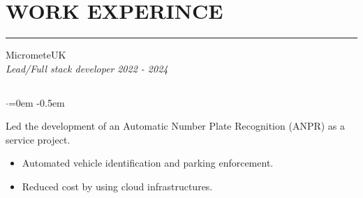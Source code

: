 \documentclass{article}
\begin{document}
\section* {WORK EXPERINCE}
\vspace{-0.6em}
\hrule 
\vspace{0.4em}
{\bf}{} MicrometeUK \hfill {} \\%
{\em Lead/Full stack developer} \hfill {\em 2022 - 2024 } %
\subsection*{}
\vspace{-2.6em}
\begin{list}{$\cdot$}{\leftmargin=0em} %
    \itemsep -0.5em \vspace{-0.5em} %
    \item Led the development of an Automatic Number Plate Recognition (ANPR) as a service project.
\end{list}
\vspace{-1.6em}
\begin{itemize}
    \item Automated vehicle identification and parking enforcement. 
    \item Reduced cost by using cloud infrastructures. 
\end{itemize}
\end{document}
